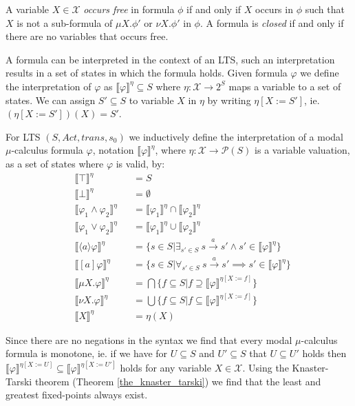 A variable $X \in \mathcal{X}$ \textit{occurs free} in formula $\phi$ if and only if $X$ occurs in $\phi$ such that $X$ is not a sub-formula of $\mu X.\phi'$ or $\nu X.\phi'$ in $\phi$. A formula is \textit{closed} if and only if there are no variables that occurs free.

A formula can be interpreted in the context of an LTS, such an interpretation results in a set of states in which the formula holds. Given formula $\varphi$ we define the interpretation of $\varphi$ as $\llbracket \varphi \rrbracket ^\eta  \subseteq S$ where $\eta : \mathcal{X}\rightarrow 2^S$ maps a variable to a set of states. We can assign $S' \subseteq S$ to variable $X$ in $\eta$ by writing $\eta[X:=S']$, ie. $(\eta[X:=S'])(X) = S'$.
\begin{definition}
	\label{def_mu_sem} For LTS $(S, Act, trans, s_0)$ we inductively define the interpretation of a modal $\mu$-calculus formula $\varphi$, notation
	$\llbracket \varphi \rrbracket^\eta$, where $\eta : \mathcal{X} \rightarrow \mathcal{P}(S)$ is a variable valuation, as a set of states
	where $\varphi$ is valid, by:
	\begin{align*}
	&\llbracket {\top} \rrbracket^\eta &&= S\\
	&\llbracket {\bot} \rrbracket^\eta &&= \emptyset\\
	&\llbracket \varphi_1 \wedge \varphi_2 \rrbracket^\eta &&= \llbracket \varphi_1 \rrbracket^\eta \cap \llbracket \varphi_2 \rrbracket^\eta \\
	&\llbracket \varphi_1 \vee \varphi_2 \rrbracket^\eta &&= \llbracket \varphi_1 \rrbracket^\eta \cup \llbracket \varphi_2 \rrbracket^\eta\\
	&\llbracket \langle a \rangle \varphi \rrbracket^\eta &&= \{s \in S|\exists_{s' \in S}\ s \xrightarrow {a} s' \wedge s' \in \llbracket \varphi \rrbracket^\eta\}\\
	&\llbracket [ a ] \varphi \rrbracket^\eta &&= \{s \in S|\forall_{s' \in S}\ s \xrightarrow {a} s' \implies s' \in \llbracket \varphi \rrbracket^\eta\}\\
	&\llbracket \mu X. \varphi \rrbracket^\eta &&= \bigcap\{f \subseteq S | f \supseteq \llbracket \varphi \rrbracket^{\eta[X:=f]}\}\\
	&\llbracket \nu X. \varphi \rrbracket^\eta &&= \bigcup\{f \subseteq S | f \subseteq \llbracket \varphi \rrbracket^{\eta[X:=f]}\}\\
	&\llbracket X \rrbracket^\eta &&= \eta(X)
	\end{align*}
\end{definition}
Since there are no negations in the syntax we find that every modal $\mu$-calculus formula is monotone, ie. if we have for $U \subseteq S$ and $U' \subseteq S$ that $U \subseteq U'$ holds then $\llbracket \varphi \rrbracket^{\eta[X:=U]} \subseteq \llbracket \varphi \rrbracket^{\eta[X:=U']}$ holds for any variable $X \in \mathcal{X}$. Using the Knaster-Tarski theorem (Theorem \ref{the_knaster_tarski}) we find that the least and greatest fixed-points always exist.

